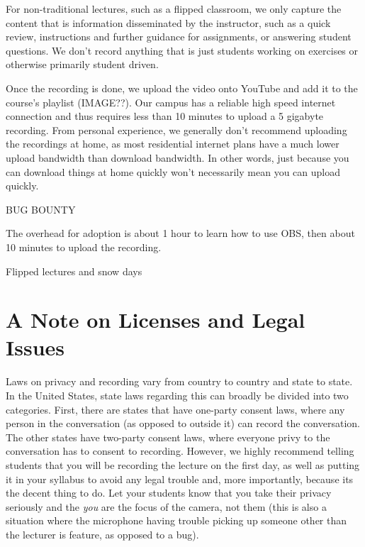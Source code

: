 \documentclass[sigconf]{acmart}
\begin{document}
For non-traditional lectures, such as a flipped classroom, we only capture the content that is information disseminated by the instructor, such as a quick review, instructions and further guidance for assignments, or answering student questions.
We don't record anything that is just students working on exercises or otherwise primarily student driven.

Once the recording is done, we upload the video onto YouTube and add it to the course's playlist (IMAGE??).
Our campus has a reliable high speed internet connection and thus requires less than 10 minutes to upload a 5 gigabyte recording.
From personal experience, we generally don't recommend uploading the recordings at home, as most residential internet plans have a much lower upload bandwidth than download bandwidth.
In other words, just because you can download things at home quickly won't necessarily mean you can upload quickly.

BUG BOUNTY


The overhead for adoption is about 1 hour to learn how to use OBS, then about 10 minutes to upload the recording.



Flipped lectures and snow days




\section{A Note on Licenses and Legal Issues}
\label{legal}

Laws on privacy and recording vary from country to country and state to state.
In the United States, state laws regarding this can broadly be divided into two categories.
First, there are states that have one-party consent laws, where any person in the conversation (as opposed to outside it) can record the conversation.
The other states have two-party consent laws, where everyone privy to the conversation has to consent to recording.
However, we highly recommend telling students that you will be recording the lecture on the first day, as well as putting it in your syllabus to avoid any legal trouble and, more importantly, because its the decent thing to do.
Let your students know that you take their privacy seriously and the \textit{you} are the focus of the camera, not them (this is also a situation where the microphone having trouble picking up someone other than the lecturer is feature, as opposed to a bug).
\end{document}
